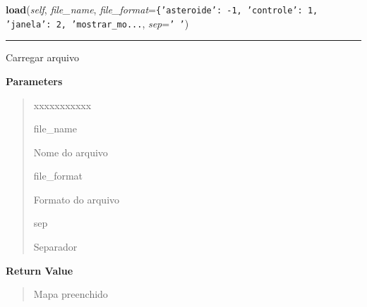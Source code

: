 \hspace{.8\funcindent}\begin{boxedminipage}{\funcwidth}

    \raggedright \textbf{load}(\textit{self}, \textit{file\_name}, \textit{file\_format}={\tt \texttt{\{}\texttt{'}\texttt{asteroide}\texttt{'}\texttt{: }-1\texttt{, }\texttt{'}\texttt{controle}\texttt{'}\texttt{: }1\texttt{, }\texttt{'}\texttt{janela}\texttt{'}\texttt{: }2\texttt{, }\texttt{'}\texttt{mostrar\_mo}\texttt{...}}, \textit{sep}={\tt \texttt{'}\texttt{ }\texttt{'}})

    \vspace{-1.5ex}

    \rule{\textwidth}{0.5\fboxrule}
\setlength{\parskip}{2ex}
    Carregar arquivo

\setlength{\parskip}{1ex}
      \textbf{Parameters}
      \vspace{-1ex}

      \begin{quote}
        \begin{Ventry}{xxxxxxxxxxx}

          \item[file\_name]

          Nome do arquivo

          \item[file\_format]

          Formato do arquivo

          \item[sep]

          Separador

        \end{Ventry}

      \end{quote}

      \textbf{Return Value}
    \vspace{-1ex}

      \begin{quote}
      Mapa preenchido

      \end{quote}

    \end{boxedminipage}

    \label{pygame-asteroids:file:FileManager:marshal}

